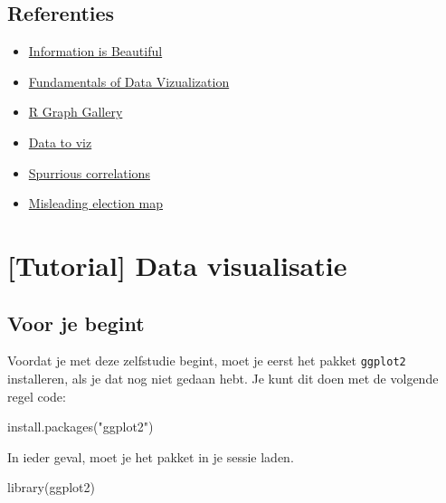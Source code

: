 \documentclass[]{tufte-book}
\newenvironment{Shaded}{}{}
\newcommand{\FunctionTok}[1]{\textcolor[rgb]{0.02,0.16,0.49}{#1}}
\newcommand{\NormalTok}[1]{#1}
\newcommand{\StringTok}[1]{\textcolor[rgb]{0.25,0.44,0.63}{#1}}
\providecommand{\tightlist}{%
  \setlength{\itemsep}{0pt}\setlength{\parskip}{0pt}}
\begin{document}
\hypertarget{referenties-1}{%
\section{Referenties}\label{referenties-1}}

\begin{itemize}
\tightlist
\item
  \href{https://informationisbeautiful.net/}{Information is Beautiful}
\item
  \href{https://serialmentor.com/dataviz/}{Fundamentals of Data Vizualization}
\item
  \href{https://www.r-graph-gallery.com/}{R Graph Gallery}
\item
  \href{https://www.data-to-viz.com/}{Data to viz}
\item
  \href{https://www.tylervigen.com/spurious-correlations}{Spurrious correlations}
\item
  \href{https://edition.cnn.com/2020/01/17/politics/donald-trump-2016-map-county-by-county/index.html}{Misleading election map}
\end{itemize}

\hypertarget{tutorial-data-visualisatie}{%
\chapter{{[}Tutorial{]} Data visualisatie}\label{tutorial-data-visualisatie}}

\hypertarget{voor-je-begint}{%
\section{Voor je begint}\label{voor-je-begint}}

Voordat je met deze zelfstudie begint, moet je eerst het pakket \texttt{ggplot2} installeren, als je dat nog niet gedaan hebt. Je kunt dit doen met de volgende regel code:

\begin{Shaded}
\begin{Highlighting}[]
\FunctionTok{install.packages}\NormalTok{(}\StringTok{"ggplot2"}\NormalTok{)}
\end{Highlighting}
\end{Shaded}

In ieder geval, moet je het pakket in je sessie laden.

\begin{Shaded}
\begin{Highlighting}[]
\FunctionTok{library}\NormalTok{(ggplot2)}
\end{Highlighting}
\end{Shaded}
\end{document}
